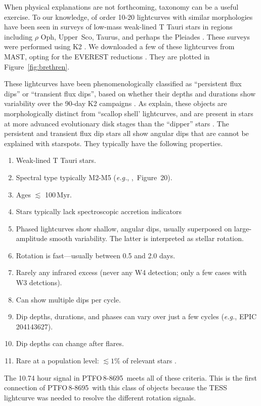 \documentclass[12pt,twocolumn,tighten]{aastex62}
\newcommand{\ptfo}{PTFO$\,$8-8695}
\begin{document}
When physical explanations are not forthcoming, taxonomy can be a
useful exercise.  To our knowledge, of order 10-20 lightcurves with
similar morphologies have been seen in surveys of low-mass weak-lined
T Tauri stars in regions including $\rho$ Oph, Upper~Sco, Taurus, and
perhaps the Pleiades
\citep{rebull_rotation_2016,david_transient_2017,stauffer_orbiting_2017,stauffer_rotevol_2018,rebull_usco_2018,rebull_rotation_2020}.
These surveys were performed using K2 \citep{howell_k2_2014}.  We
downloaded a few of these lightcurves from MAST, opting for the
EVEREST reductions \citep{luger_everest_2016,luger_update_2018}.  They
are plotted in Figure~\ref{fig:brethren}.

These lightcurves have been phenomenologically classified as
``persistent flux dips'' or ``transient flux dips'', based on whether
their depths and durations show variability over the 90-day K2
campaigns \citep{stauffer_orbiting_2017}.
As \citet{stauffer_orbiting_2017} explain,
these  objects are morphologically distinct from ``scallop shell' lightcurves,
and are present in stars at more advanced evolutionary disk stages than
the ``dipper'' stars \citep{ansdell_young_2016,cody_manyfaceted_2018}.
The persistent and transient flux dip stars all show angular dips
that are cannot be explained with starspots.
They typically have the following properties.
\begin{enumerate}[topsep=0.5ex,itemsep=-0.5ex,partopsep=1ex,parsep=1.5ex]
  \item Weak-lined T Tauri stars.
  \item Spectral type typically M2-M5 ({\it e.g.},
    \citealt{rebull_usco_2018},~Figure~20).
  \item Ages $\lesssim$ 100$\,$Myr.
  \item Stars typically lack spectroscopic accretion indicators 
  \item Phased lightcurves show shallow, angular dips, usually
    superposed on large-amplitude smooth variability. The latter
    is interpreted as stellar rotation.
  \item Rotation is fast---usually between 0.5 and 2.0 days.
  \item Rarely any infrared excess (never any W4 detection; only a few
    cases with W3 detctions).
  \item Can show multiple dips per cycle.
  \item Dip depths, durations, and phases can vary over just a few cycles
    ({\it e.g.}, EPIC 204143627).
  \item Dip depths can change after flares.
  \item Rare at a population level: $\lesssim 1\%$ of relevant stars
    \citep{rebull_usco_2018}.
\end{enumerate}
The 10.74 hour signal in \ptfo\ meets all of these criteria.
This is the first connection of \ptfo\ with this class of objects
because the TESS lightcurve was needed to resolve the different
rotation signals.
\end{document}
